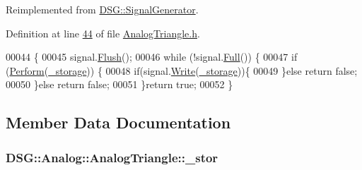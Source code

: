 Reimplemented from \hyperlink{class_d_s_g_1_1_signal_generator_ab050f80e84e6c8b3e354b56930d6a02b}{D\+S\+G\+::\+Signal\+Generator}.



Definition at line \hyperlink{_analog_triangle_8h_source_l00044}{44} of file \hyperlink{_analog_triangle_8h_source}{Analog\+Triangle.\+h}.


\begin{DoxyCode}
00044                                                                          \{
00045             signal.\hyperlink{class_d_s_g_1_1_ring_buffer_ab23c8003d2857809a816068eeb209d60}{Flush}();
00046             \textcolor{keywordflow}{while} (!signal.\hyperlink{class_d_s_g_1_1_ring_buffer_a53ddb04ffcbb5470a8d2b0a3c65b70cb}{Full}()) \{
00047                 \textcolor{keywordflow}{if} (\hyperlink{class_d_s_g_1_1_analog_1_1_analog_triangle_a9b2484f3eb4c4ad545cb88b8833be124}{Perform}(\hyperlink{class_d_s_g_1_1_signal_generator_a28a9b47a1aa0783029f11a19ba0363f2}{\_storage})) \{
00048                     \textcolor{keywordflow}{if}(signal.\hyperlink{class_d_s_g_1_1_ring_buffer_aa5dd2caa0a270173251faee40a43d692}{Write}(\hyperlink{class_d_s_g_1_1_signal_generator_a28a9b47a1aa0783029f11a19ba0363f2}{\_storage}))\{
00049                     \}\textcolor{keywordflow}{else} \textcolor{keywordflow}{return} \textcolor{keyword}{false};
00050                 \}\textcolor{keywordflow}{else} \textcolor{keywordflow}{return} \textcolor{keyword}{false};
00051             \}\textcolor{keywordflow}{return} \textcolor{keyword}{true};
00052         \}
\end{DoxyCode}


\subsection{Member Data Documentation}
\hypertarget{class_d_s_g_1_1_analog_1_1_analog_triangle_ac93bccb7e366491f45ea9c3af04072ae}{
\subsubsection[{\+\_\+stor}]{ D\+S\+G\+::\+Analog\+::\+Analog\+Triangle\+::\+\_\+stor\hspace{0.3cm}{\ttfamily [protected]}}}\label{class_d_s_g_1_1_analog_1_1_analog_triangle_ac93bccb7e366491f45ea9c3af04072ae}


